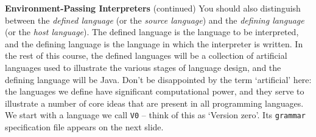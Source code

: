 \begin{minipage}[t]{\sw}
\slidenumber
\LARGE
{\bf Environment-Passing Interpreters} (continued)\exx
You should also distinguish between
the {\em defined language} (or the {\em source language})
and the {\em defining language} (or the {\em host language}).\exx
The defined language is the language to be interpreted,
and the defining language is the language
in which the interpreter is written.\exx
In the rest of this course,
the defined languages will be a collection of artificial languages used
to illustrate the various stages of language design,
and the defining language will be Java.
Don't be disappointed by the term `artificial' here:
the languages we define have significant computational power,
and they serve to illustrate
a number of core ideas that are present in all programming languages.\exx
We start with a language we call \verb'V0' --
think of this as `Version zero'.
Its \verb'grammar' specification file appears on the next slide.
\end{minipage}
